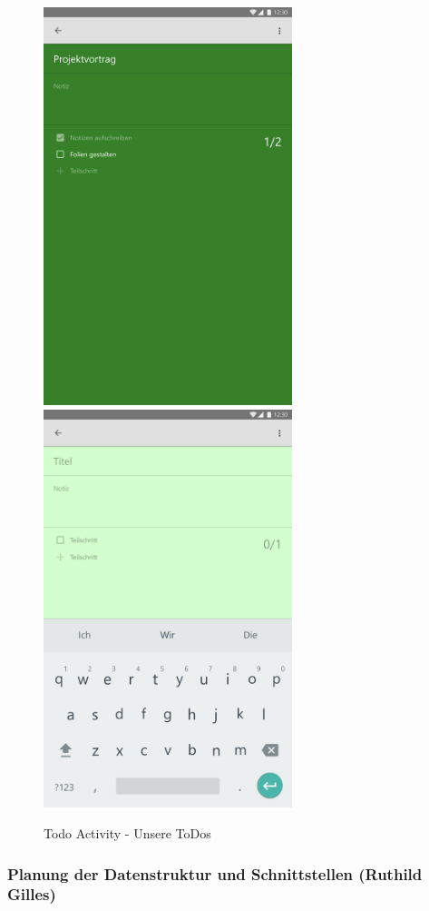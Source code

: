 \begin{figure}[H]
	\caption{Todo Activity - Unsere ToDos}
	\centering
	\includegraphics[width=7.25cm]{img/ToDoActivity.pdf}
	\includegraphics[width=7.25cm]{img/ToDoActivityNew.pdf}
	\label{img:ToDoActivity}
\end{figure}

\newpage
\subsubsection{Planung der Datenstruktur und Schnittstellen (Ruthild Gilles)}


